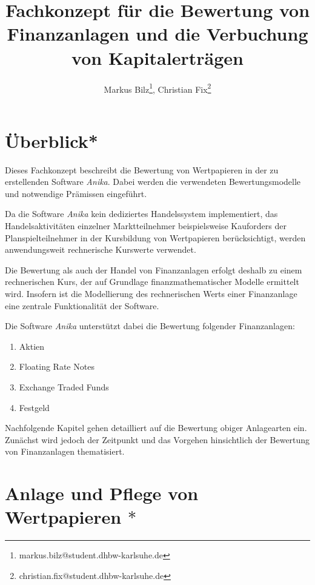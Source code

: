 \documentclass[12pt, a4paper]{article}
\title{Fachkonzept für die Bewertung von Finanzanlagen und die Verbuchung von Kapitalerträgen}
\author{Markus Bilz\thanks{markus.bilz@student.dhbw-karlsuhe.de}, Christian Fix\thanks{christian.fix@student.dhbw-karlsuhe.de}}
\begin{document}
\maketitle

\section{Überblick*}
Dieses Fachkonzept beschreibt die Bewertung von Wertpapieren in der zu erstellenden Software \textit{Anika}. 
Dabei werden die verwendeten Bewertungsmodelle und notwendige Prämissen eingeführt.

Da die Software \textit{Anika} kein dediziertes Handelssystem implementiert, das Handelsaktivitäten einzelner Marktteilnehmer beispielsweise Kauforders der Planspielteilnehmer in der Kursbildung von Wertpapieren berücksichtigt, werden anwendungsweit rechnerische Kurswerte verwendet. 

Die Bewertung als auch der Handel von Finanzanlagen erfolgt deshalb zu einem rechnerischen Kurs, der auf Grundlage finanzmathematischer Modelle ermittelt wird. Insofern ist die Modellierung des rechnerischen Werts einer Finanzanlage eine zentrale Funktionalität der Software.

Die Software \textit{Anika} unterstützt dabei die Bewertung folgender Finanzanlagen:
\begin{enumerate}
	\item Aktien
	\item Floating Rate Notes
	\item Exchange Traded Funds
	\item Festgeld
\end{enumerate}

Nachfolgende Kapitel gehen detailliert auf die Bewertung obiger Anlagearten ein. Zunächst wird jedoch der Zeitpunkt und das Vorgehen hinsichtlich der Bewertung von Finanzanlagen thematisiert.

\section{Anlage und Pflege von Wertpapieren $\ast$}
\label{sec:anlage_und_pflege_der_wertpapiere}
\end{document}
